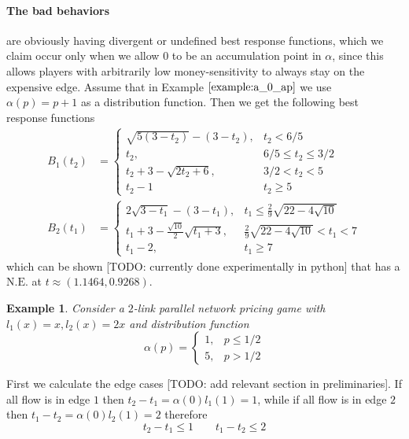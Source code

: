 \documentclass[a4paper,11pt]{article}
\newcommand{\NE}{\mathrm{N.E.}}
\newtheorem{example}{Example}[section]
\begin{document}
\paragraph{The bad behaviors} are obviously having divergent or undefined best response functions, which we claim occur only when we allow $0$ to be an accumulation point in $\alpha$, since this allows players with arbitrarily low money-sensitivity to always stay on the expensive edge.
Assume that in Example $\ref{example:a_0_ap}$ we use $\alpha(p) = p + 1$ as a distribution function.
Then we get the following best response functions
\begin{align*}
	B_1(t_2) &=
	\begin{cases}
		\sqrt{5 (3 - t_2)} - (3 - t_2), & t_2 < 6/5 \\
		t_2, & 6/5 \le t_2 \le 3/2 \\
		t_2 + 3 - \sqrt{2 t_2 + 6}, & 3/2 < t_2 < 5 \\
		t_2 - 1 & t_2 \ge 5
	\end{cases}\\
	B_2(t_1) &=
	\begin{cases}
		2 \sqrt{3 - t_1} - (3 - t_1), & t_1 \le \frac29 \sqrt{22 - 4 \sqrt{10}} \\
		t_1 + 3 - \frac{\sqrt{10}}2 \sqrt{t_1 + 3}, & \frac29 \sqrt{22 - 4 \sqrt{10}} < t_1 < 7 \\
		t_1 - 2, & t_1 \ge 7
	\end{cases}
\end{align*}
which can be shown [TODO: currently done experimentally in python] that has a $\NE$ at $t \approx (1.1464, 0.9268)$.

\begin{example}
	Consider a $2$-link parallel network pricing game with $l_1(x) = x, l_2(x) = 2x$ and distribution function
	\[
		\alpha(p) =
		\begin{cases}
			1, & p \le 1/2 \\
			5, & p > 1/2
		\end{cases}
	\]
\end{example}

First we calculate the edge cases [TODO: add relevant section in preliminaries].
If all flow is in edge $1$ then $t_2 - t_1 = \alpha(0) l_1(1) = 1$, while if all flow is in edge $2$ then $t_1 - t_2 = \alpha(0) l_2(1) = 2$ therefore
\[t_2 - t_1 \le 1 \qquad t_1 - t_2 \le 2\]
\end{document}

